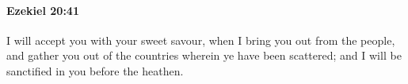 
		\paragraph{Ezekiel 20:41} %
			\label{EZEKIEL-20-41}

			I will accept you with your sweet savour, when I bring you out from the people, and gather you out of the countries wherein ye have been scattered; and I will be sanctified in you before the heathen.


